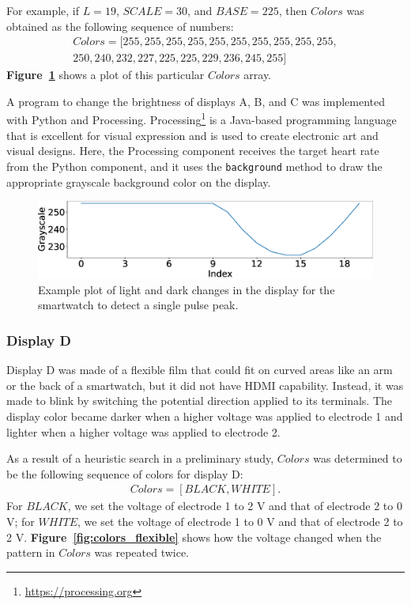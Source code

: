 \documentclass{ieeeaccess}
\newcommand\figref[1]{\textbf{Figure~\ref{fig:#1}}}
\begin{document}
For example, if $L=19$, $SCALE=30$, and $BASE=225$, then $Colors$ was obtained as the following sequence of numbers:
\begin{equation*}
  \begin{split}
    Colors = [255, 255, 255, 255, 255, 255, 255, 255, 255, 255,\\250, 240, 232, 227, 225, 225, 229, 236, 245, 255]
  \end{split}
\end{equation*}
\figref{colors_wave} shows a plot of this particular $Colors$ array.\par

A program to change the brightness of displays A, B, and C was implemented with Python and Processing. Processing\footnote{\url{https://processing.org}} is a Java-based programming language that is excellent for visual expression and is used to create electronic art and visual designs. Here, the Processing component receives the target heart rate from the Python component, and it uses the \texttt{background} method to draw the appropriate grayscale background color on the display.

\begin{figure}[!t]
  \centering
  \includegraphics[width=1\linewidth]{figures/colors_wave.eps}
  \caption{Example plot of light and dark changes in the display for the smartwatch to detect a single pulse peak.}
  \label{fig:colors_wave}
\end{figure}

\subsubsection{Display D}
Display D was made of a flexible film that could fit on curved areas like an arm or the back of a smartwatch, but it did not have HDMI capability. Instead, it was made to blink by switching the potential direction applied to its terminals. The display color became darker when a higher voltage was applied to electrode 1 and lighter when a higher voltage was applied to electrode 2.\par

As a result of a heuristic search in a preliminary study, $Colors$ was determined to be the following sequence of colors for display D:
\begin{equation*}
  \begin{split}
    Colors = [BLACK, WHITE].
  \end{split}
\end{equation*}
For $BLACK$, we set the voltage of electrode 1 to 2 V and that of electrode 2 to 0 V; for $WHITE$, we set the voltage of electrode 1 to 0 V and that of electrode 2 to 2 V. \figref{colors_flexible} shows how the voltage changed when the pattern in $Colors$ was repeated twice.\par
\end{document}
